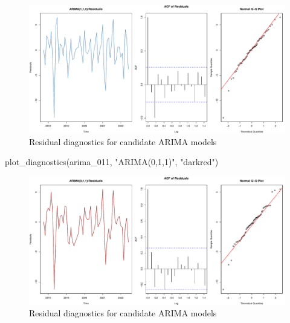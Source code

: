 \documentclass[
  11pt,
]{article}
\newenvironment{Shaded}{\begin{snugshade}}{\end{snugshade}}
\newcommand{\FunctionTok}[1]{\textcolor[rgb]{0.28,0.35,0.67}{#1}}
\newcommand{\NormalTok}[1]{\textcolor[rgb]{0.00,0.23,0.31}{#1}}
\newcommand{\StringTok}[1]{\textcolor[rgb]{0.13,0.47,0.30}{#1}}
\begin{document}
\begin{figure}[H]

{\centering \includegraphics{project_files/figure-pdf/fig-arima-diagnostics-1.pdf}

}

\caption{Residual diagnostics for candidate ARIMA models}

\end{figure}%

\begin{Shaded}
\begin{Highlighting}[]
\FunctionTok{plot\_diagnostics}\NormalTok{(arima\_011, }\StringTok{"ARIMA(0,1,1)"}\NormalTok{, }\StringTok{"darkred"}\NormalTok{)}
\end{Highlighting}
\end{Shaded}

\begin{figure}[H]

{\centering \includegraphics{project_files/figure-pdf/fig-arima-diagnostics-2.pdf}

}

\caption{Residual diagnostics for candidate ARIMA models}

\end{figure}%
\end{document}
